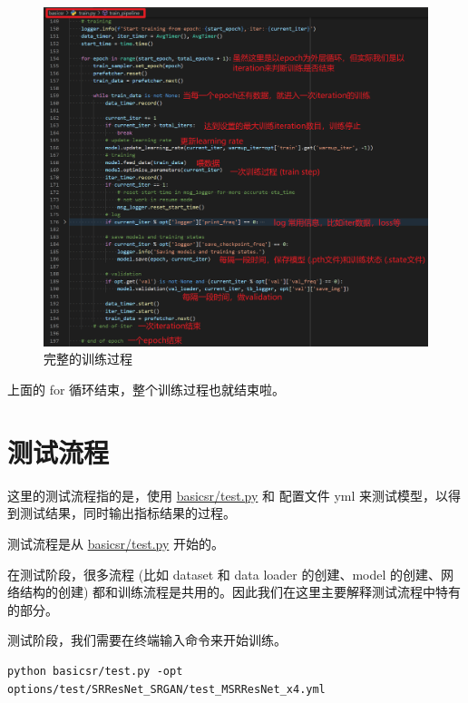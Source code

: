 \documentclass[../main.tex]{subfiles}
\begin{document}
\begin{figure}[h]
    \begin{center}
        \vspace{-0.2cm}
        \includegraphics[width=0.85\linewidth]{figures/getting_start_training_loop.png}
        \vspace{-0.3cm}
        \caption{完整的训练过程}
        \label{fig:getting_start_training_loop}
    \end{center}
    \vspace{-0.5cm}
\end{figure}

上面的 for 循环结束，整个训练过程也就结束啦。


\section{测试流程}\label{getting_start:test_pipeline}

这里的测试流程指的是，使用 \href{https://github.com/XPixelGroup/BasicSR/blob/master/basicsr/test.py}{basicsr/test.py} 和 配置文件 yml 来测试模型，以得到测试结果，同时输出指标结果的过程。

测试流程是从 \href{https://github.com/XPixelGroup/BasicSR/blob/master/basicsr/test.py}{basicsr/test.py} 开始的。

在测试阶段，很多流程 (比如 dataset 和 data loader 的创建、model 的创建、网络结构的创建) 都和训练流程是共用的。因此我们在这里主要解释测试流程中特有的部分。

测试阶段，我们需要在终端输入命令来开始训练。
\begin{verbatim}
python basicsr/test.py -opt options/test/SRResNet_SRGAN/test_MSRResNet_x4.yml
\end{verbatim}
\end{document}
